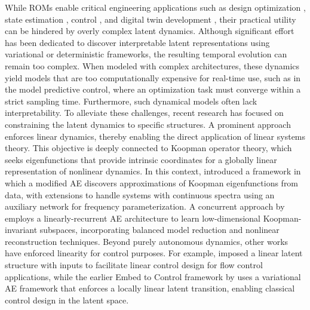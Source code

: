 \documentclass{article}
\begin{document}
While ROMs enable critical engineering applications such as design optimization \citep{park2013reduced}, state estimation \citep{sommer2023estimating}, control \citep{tomasetto2025latent}, and digital twin development \citep{kapteyn2022data}, their practical utility can be hindered by overly complex latent dynamics.
Although significant effort has been dedicated to discover interpretable latent representations using variational \citep{higgins2017beta} or deterministic \citep{schwarz2025disentangled} frameworks, the resulting temporal evolution can remain too complex.
When modeled with complex architectures, these dynamics yield models that are too computationally expensive for real-time use, such as in the model predictive control, where an optimization task must converge within a strict sampling time.
Furthermore, such dynamical models often lack interpretability.
To alleviate these challenges, recent research has focused on constraining the latent dynamics to specific structures.
A prominent approach enforces linear dynamics, thereby enabling the direct application of linear systems theory.
This objective is deeply connected to Koopman operator theory, which seeks eigenfunctions that provide intrinsic coordinates for a globally linear representation of nonlinear dynamics.
In this context, \cite{lusch2018deep} introduced a framework in which a modified AE discovers approximations of Koopman eigenfunctions from data, with extensions to handle systems with continuous spectra using an auxiliary network for frequency parameterization.
A concurrent approach by \cite{otto2019linearly} employs a linearly-recurrent AE architecture to learn low-dimensional Koopman-invariant subspaces, incorporating balanced model reduction and nonlinear reconstruction techniques.
Beyond purely autonomous dynamics, other works have enforced linearity for control purposes.
For example, \cite{ishize2024flow} imposed a linear latent structure with inputs to facilitate linear control design for flow control applications, while the earlier Embed to Control framework by \cite{watter2015embed} uses a variational AE framework that enforces a locally linear latent transition, enabling classical control design in the latent space.
\end{document}

